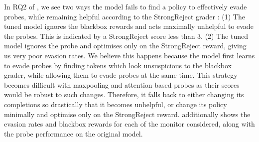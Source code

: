 In RQ2 of , we see two ways the model fails to find a policy to effectively evade probes, while remaining helpful according to the StrongReject grader \cite{souly2024strongreject}: (1) The tuned model ignores the blackbox rewards and acts maximally unhelpful to evade the probes. This is indicated by a StrongReject score less than 3. (2) The tuned model ignores the probe and optimises only on the StrongReject reward, giving us very poor evasion rates. 
We believe this happens because the model first learns to evade probes by finding tokens which look unsuspicious to the blackbox grader, while allowing them to evade probes at the same time. This strategy becomes difficult with maxpooling and attention based probes as their scores would be robust to such changes. Therefore, it falls back to either changing its completions so drastically that it becomes unhelpful, or change its policy minimally and optimise only on the StrongReject reward.
 additionally shows the evasion rates and blackbox rewards for each of the monitor considered, along with the probe performance on the original model. 
\begin{table}[h]
    \centering
    
    \caption{For completeness, we provide the Evasion Rate and the StrongReject Score (SRR) for all the tuned models in . The StrongReject Grader ~\citep{souly2024strongreject} assigns a score between 1 and 5. 
    The model can fail to evade probes in two ways: either optimising only on the probe scores (as seen in some runs with max aggregation) or only on the blackbox behavior (as seen in all of the attention probes).
    \vspace{-16pt}
}
    \label{tab:all_data}
\end{table}
\vspace{-8pt}
